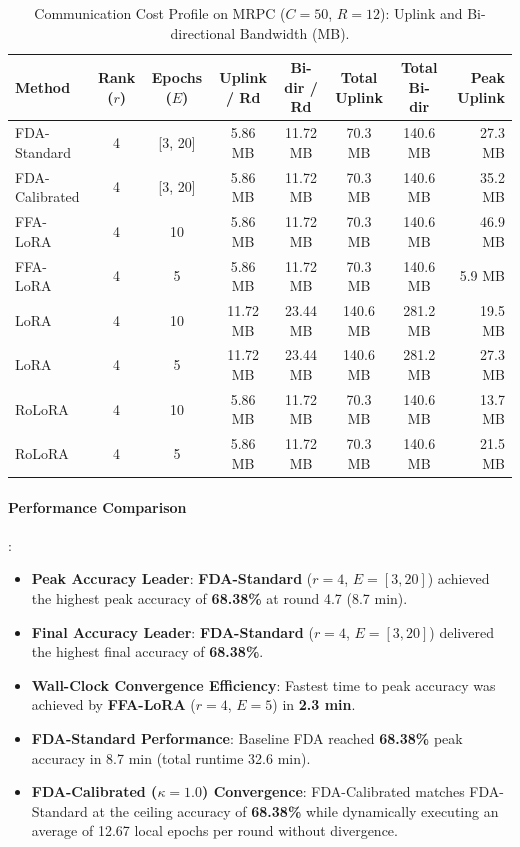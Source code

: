 \documentclass[10pt,a4paper]{article}
\begin{document}
\begin{table}[H]
\centering
\caption{Communication Cost Profile on MRPC ($C=50$, $R=12$): Uplink and Bi-directional Bandwidth (MB).}
\scriptsize
\setlength{\tabcolsep}{4.0pt}
\begin{tabular*}{\textwidth}{@{\extracolsep{\fill}}lccccccr@{}}
\toprule
\textbf{Method} & \textbf{Rank ($r$)} & \textbf{Epochs ($E$)} & \textbf{Uplink / Rd} & \textbf{Bi-dir / Rd} & \textbf{Total Uplink} & \textbf{Total Bi-dir} & \textbf{Peak Uplink} \\
\midrule
FDA-Standard & 4 & [3, 20] & 5.86 MB & 11.72 MB & 70.3 MB & 140.6 MB & 27.3 MB \\
FDA-Calibrated & 4 & [3, 20] & 5.86 MB & 11.72 MB & 70.3 MB & 140.6 MB & 35.2 MB \\
FFA-LoRA & 4 & 10 & 5.86 MB & 11.72 MB & 70.3 MB & 140.6 MB & 46.9 MB \\
FFA-LoRA & 4 & 5 & 5.86 MB & 11.72 MB & 70.3 MB & 140.6 MB & 5.9 MB \\
LoRA & 4 & 10 & 11.72 MB & 23.44 MB & 140.6 MB & 281.2 MB & 19.5 MB \\
LoRA & 4 & 5 & 11.72 MB & 23.44 MB & 140.6 MB & 281.2 MB & 27.3 MB \\
RoLoRA & 4 & 10 & 5.86 MB & 11.72 MB & 70.3 MB & 140.6 MB & 13.7 MB \\
RoLoRA & 4 & 5 & 5.86 MB & 11.72 MB & 70.3 MB & 140.6 MB & 21.5 MB \\
\bottomrule
\end{tabular*}
\end{table}

\paragraph{Performance Comparison}:
\begin{itemize}
    \item \textbf{Peak Accuracy Leader}: \textbf{FDA-Standard} ($r=4$, $E=[3, 20]$) achieved the highest peak accuracy of \textbf{68.38\%} at round 4.7 (8.7 min).
    \item \textbf{Final Accuracy Leader}: \textbf{FDA-Standard} ($r=4$, $E=[3, 20]$) delivered the highest final accuracy of \textbf{68.38\%}.
    \item \textbf{Wall-Clock Convergence Efficiency}: Fastest time to peak accuracy was achieved by \textbf{FFA-LoRA} ($r=4$, $E=5$) in \textbf{2.3 min}.
    \item \textbf{FDA-Standard Performance}: Baseline FDA reached \textbf{68.38\%} peak accuracy in 8.7 min (total runtime 32.6 min).
    \item \textbf{FDA-Calibrated ($\kappa=1.0$) Convergence}: FDA-Calibrated matches FDA-Standard at the ceiling accuracy of \textbf{68.38\%} while dynamically executing an average of 12.67 local epochs per round without divergence.
\end{itemize}
\end{document}
